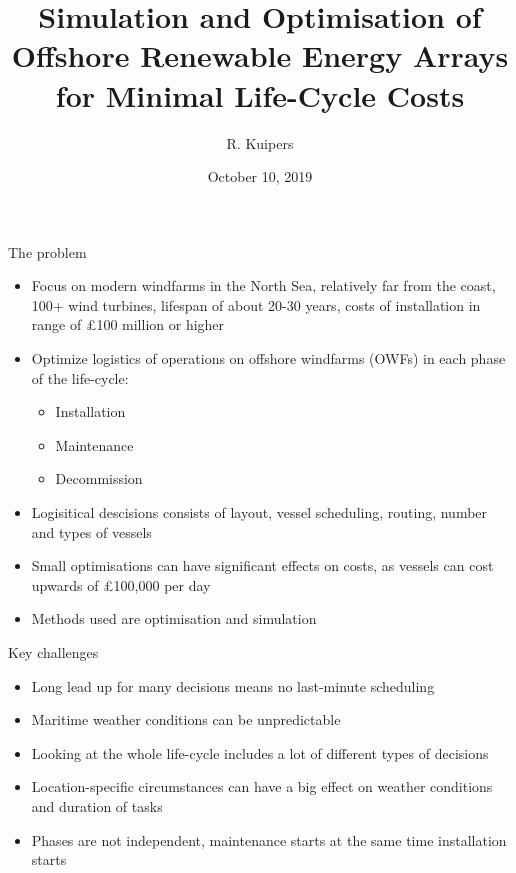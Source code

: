 \documentclass{beamer}
\title[Logistical Optimisation for Offshore Windfarms]{Simulation and Optimisation of Offshore Renewable Energy Arrays for Minimal Life-Cycle Costs}
\author{R. Kuipers}
\date{October 10, 2019}
\begin{document}
\begin{frame}
  \titlepage
\end{frame}

\begin{frame}{The problem}
  \begin{itemize}
  	\item Focus on modern windfarms in the North Sea, relatively far from the coast, 100+ wind turbines, lifespan of about 20-30 years, costs of installation in range of \pounds 100 million or higher
  	\item Optimize logistics of operations on offshore windfarms (OWFs) in each phase of the life-cycle:
  	\begin{itemize}
  		\item Installation
  		\item Maintenance
  		\item Decommission
  	\end{itemize}
  	\item Logisitical descisions consists of layout, vessel scheduling, routing, number and types of vessels
  	\item Small optimisations can have significant effects on costs, as vessels can cost upwards of \pounds 100,000 per day
  	\item Methods used are optimisation and simulation
  \end{itemize}
\end{frame}


\begin{frame}{Key challenges}
  \begin{itemize}
  	\item Long lead up for many decisions means no last-minute scheduling
  	\item Maritime weather conditions can be unpredictable
  	\item Looking at the whole life-cycle includes a lot of different types of decisions
  	\item Location-specific circumstances can have a big effect on weather conditions and duration of tasks
  	\item Phases are not independent, maintenance starts at the same time installation starts
  \end{itemize}
\end{frame}
\end{document}
